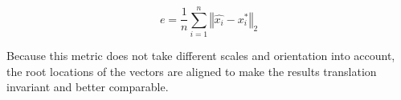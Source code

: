 \documentclass[twoside]{article}
\begin{document}
\begin{multicols}{2}
\newcommand\norm[1]{\left\Vert#1\right\Vert}

\[
    e = \frac{1}{n} \sum_{i=1}^{n} \norm{\hat{x_i} - x_i^{*}}_2
\]

Because this metric does not take different scales and orientation into account, the root locations of the vectors are aligned to make the results translation invariant and better comparable.






\end{multicols}
\end{document}
